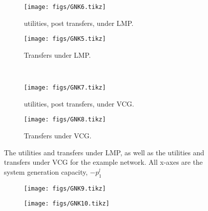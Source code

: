 \begin{figure}[]
	\begin{subfigure}{.48\linewidth}
		\texttt{[image: figs/GNK6.tikz]}%
		\caption{ utilities, post transfers, under LMP.}\label{fig:1e}
	\end{subfigure}
	\begin{subfigure}{.48\linewidth}
		\texttt{[image: figs/GNK5.tikz]}%
		\caption{ Transfers under LMP.}\label{fig:1f}
	\end{subfigure}
\vspace{5mm}\\
	\begin{subfigure}{.48\linewidth}
		\texttt{[image: figs/GNK7.tikz]}%
		\caption{ utilities, post transfers, under VCG.}\label{fig:1g}
	\end{subfigure}
	\begin{subfigure}{.48\linewidth}
		\texttt{[image: figs/GNK8.tikz]}%
		\caption{ Transfers under VCG.}\label{fig:1h}
	\end{subfigure}
	\vspace{0.3\baselineskip}
	\caption[Power-levels and utility imputations under LMP and VCG for example network]{The utilities and transfers under LMP, as well as the utilities and transfers under VCG for the example network. All x-axes are the system generation capacity, $-p_1^l$}\label{fig:11}
\end{figure}


\begin{figure}[]
	\begin{subfigure}{.48\linewidth}
		\texttt{[image: figs/GNK9.tikz]}%
		\caption{\DIFaddbeginFL {}\DIFaddendFL}\label{fig:1i}
	\end{subfigure}
	\begin{subfigure}{.48\linewidth}
		\texttt{[image: figs/GNK10.tikz]}%
		\caption{\DIFaddbeginFL {}\DIFaddendFL}\label{fig:1j}
	\end{subfigure}
	\vspace{0.3\baselineskip}
	\caption[Power-levels and utility imputations under Shapley Value for example network]{\DIFaddbeginFL {}\DIFaddendFL}\label{fig:111}
\end{figure}

